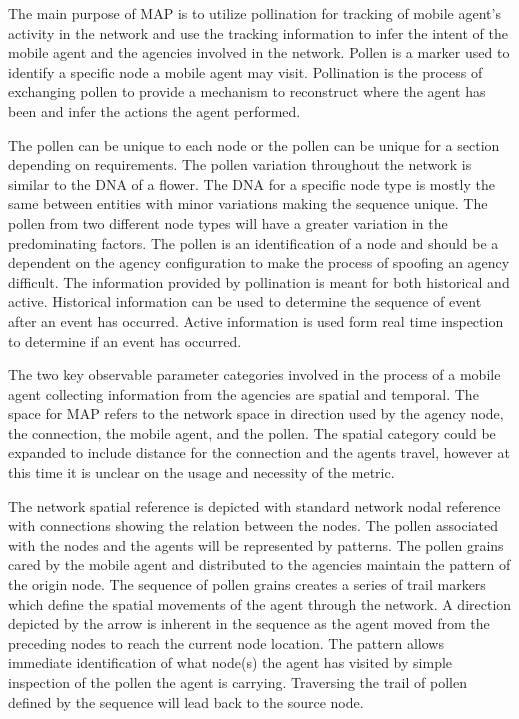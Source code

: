 \documentclass{acm_proc_article-sp}
\begin{document}
The main purpose of MAP is to utilize pollination for tracking of mobile agent’s activity in the network and use the tracking information to infer the intent of the mobile agent and the agencies involved in the network.  Pollen is a marker used to identify a specific node a mobile agent may visit. Pollination is the process of exchanging pollen to provide a mechanism to reconstruct where the agent has been and infer the actions the agent performed.

The pollen can be unique to each node or the pollen can be unique for a section depending on requirements. The pollen variation throughout the network is similar to the DNA of a flower. The DNA for a specific node type is mostly the same between entities with minor variations making the sequence unique. The pollen from two different node types will have a greater variation in the predominating factors. The pollen is an identification of a node and should be a dependent on the agency configuration to make the process of spoofing an agency difficult. The information provided by pollination is meant for both historical and active. Historical information can be used to determine the sequence of event after an event has occurred. Active information is used form real time inspection to determine if an event has occurred.

The two key observable parameter categories involved in the process of a mobile agent collecting information from the agencies are spatial and temporal. The space for MAP refers to the network space in direction used by the agency node, the connection, the mobile agent, and the pollen.  The spatial category could be expanded to include distance for the connection and the agents travel, however at this time it is unclear on the usage and necessity of the metric.  

The network spatial reference is depicted with standard network nodal reference with connections showing the relation between the nodes.  The pollen associated with the nodes and the agents will be represented by patterns. The pollen grains cared by the mobile agent and distributed to the agencies maintain the pattern of the origin node.  The sequence of pollen grains creates a series of trail markers which define the spatial movements of the agent through the network.  A direction depicted by the arrow is inherent in the sequence as the agent moved from the preceding nodes to reach the current node location. The pattern allows immediate identification of what node(s) the agent has visited by simple inspection of the pollen the agent is carrying. Traversing the trail of pollen defined by the sequence will lead back to the source node.
\end{document}
